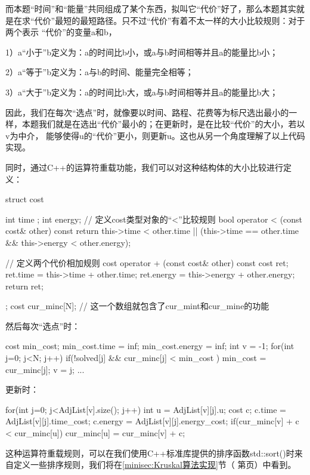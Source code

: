 而本题“时间”和“能量”共同组成了某个东西，拟叫它“代价”好了，那么本题其实就是在求“代价”最短的最短路径。只不过“代价”有着不太一样的大小比较规则：对于两个表示
“代价”的变量a和b，

1）a“小于”b定义为：a的时间比b小，或a与b时间相等并且a的能量比b小；

2）a“等于”b定义为：a与b的时间、能量完全相等；

3）a“大于”b定义为：a的时间比b大，或a与b时间相等并且a的能量比b大；

因此，我们在每次“选点”时，就像要以时间、路程、花费等为标尺选出最小的一样，本题我们就是在选出“代价”最小的；在更新时，是在比较“代价”的大小，若以v为中介，
能够使得u的“代价”更小，则更新u。这也从另一个角度理解了以上代码实现。

同时，通过C++的运算符重载功能，我们可以对这种结构体的大小比较进行定义：
\begin{cppcode}
    struct cost {
        int time ;
        int energy;
        // 定义cost类型对象的“<”比较规则
        bool operator < (const cost& other) const {
            return this->time < other.time ||
                (this->time == other.time && this->energy < other.energy);
        }

        // 定义两个代价相加规则
        cost operator + (const cost& other) const {
            cost ret;
            ret.time = this->time + other.time;
            ret.energy = this->energy + other.energy;
            return ret;
        }
    };
    cost cur_minc[N];   // 这一个数组就包含了cur_mint和cur_mine的功能
\end{cppcode}
然后每次“选点”时：
\begin{cppcode}
    cost min_cost;
    min_cost.time = inf;
    min_cost.energy = inf;
    int v = -1;
    for(int j=0; j<N; j++) {
        if(!solved[j] && cur_minc[j] < min_cost ) {
            min_cost = cur_minc[j];
            v = j;
        }
    }
    ...
\end{cppcode}
更新时：
\begin{cppcode}
    for(int j=0; j<AdjList[v].size(); j++) {
        int u = AdjList[v][j].u;
        cost c;
        c.time = AdjList[v][j].time_cost;
        c.energy = AdjList[v][j].energy_cost;
        if(cur_minc[v] + c < cur_minc[u]) {
            cur_minc[u] = cur_minc[v] + c;
        }
    }
\end{cppcode}
这种运算符重载规则，可以在我们使用C++标准库提供的排序函数std::sort()时来自定义一些排序规则，我们将在\ref{minisec:Kruskal算法实现}节（
第\pageref{minisec:Kruskal算法实现}页）中看到。




